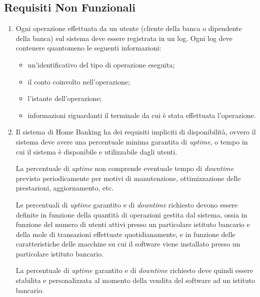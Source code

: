 \subsection{Requisiti Non Funzionali}
\label{sec:utente:non-funzionali}

\begin{enumerate}
	\item \label{itm:utente:non-funzionali:logging} Ogni operazione effettuata da un utente (cliente della banca o dipendente della banca) sul sistema deve essere registrata in un log.
	Ogni log deve contenere quantomeno le seguenti informazioni:
	\begin{itemize}
		\item un'identificativo del tipo di operazione eseguita;
		\item il conto coinvolto nell'operazione;
		\item l'istante dell'operazione;
		\item informazioni riguardanti il terminale da cui \`e stata effettuata l'operazione.
	\end{itemize}

	\item \label{itm:utente:non-funzionali:uptime} Il sistema di Home Banking ha dei requisiti impliciti di disponibilit\`a, ovvero il sistema deve avere una percentuale minima garantita di \emph{uptime}, o tempo in cui il sistema \`e disponibile e utilizzabile dagli utenti.

	La percentuale di \emph{uptime} non comprende eventuale tempo di \emph{downtime} previsto periodicamente per motivi di manutenzione, ottimizzazione delle prestazioni, aggiornamento, etc.

	Le percentuali di \emph{uptime} garantito e di \emph{downtime} richiesto devono essere definite in funzione della quantit\`a di operazioni gestita dal sistema, ossia in funzione del numero di utenti attivi presso un particolare istituto bancario e della mole di transazioni effettuate quotidianamente, e in funzione delle caratteristiche delle macchine su cui il software viene installato presso un particolare istituto bancario.

	La percentuale di \emph{uptime} garantito e di \emph{downtime} richiesto deve quindi essere stabilita e personalizzata al momento della vendita del software ad un istituto bancario.


\end{enumerate}

